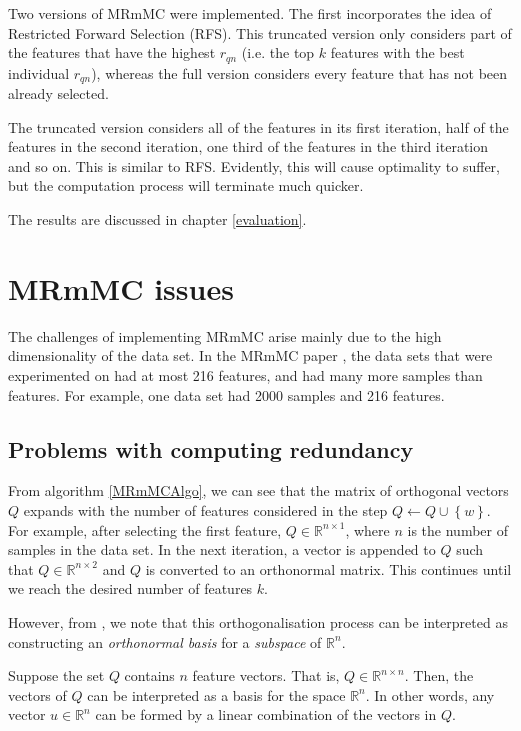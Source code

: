 \documentclass[12pt, twoside, a4paper]{report}
\begin{document}
Two versions of MRmMC were implemented. The first incorporates the idea of Restricted Forward Selection (RFS). This truncated version only considers part of the features that have the highest $r_{qn}$ (i.e. the top $k$ features with the best individual $r_{qn}$), whereas the full version considers every feature that has not been already selected.

The truncated version considers all of the features in its first iteration, half of the features in the second iteration, one third of the features in the third iteration and so on. This is similar to RFS. Evidently, this will cause optimality to suffer, but the computation process will terminate much quicker.

The results are discussed in chapter \ref{evaluation}.

\section{MRmMC issues} \label{mrmmc:issues}

The challenges of implementing MRmMC arise mainly due to the high dimensionality of the data set. In the MRmMC paper \cite{RefWorks:187}, the data sets that were experimented on had at most 216 features, and had many more samples than features. For example, one data set had 2000 samples and 216 features.

\subsection{Problems with computing redundancy} \label{mrmmc_probs}

From algorithm \ref{MRmMCAlgo}, we can see that the matrix of orthogonal vectors $Q$ expands with the number of features considered in the step $Q \longleftarrow Q \cup \left\lbrace w \right\rbrace$. For example, after selecting the first feature, $Q \in \mathbb{R}^{n \times 1}$, where $n$ is the number of samples in the data set. In the next iteration, a vector is appended to $Q$ such that $Q \in \mathbb{R}^{n \times 2}$ and $Q$ is converted to an orthonormal matrix. This continues until we reach the desired number of features $k$.

However, from \cite{RefWorks:253}, we note that this orthogonalisation process can be interpreted as constructing an \textit{orthonormal basis} for a \textit{subspace} of $\mathbb{R}^{n}$.

Suppose the set $Q$ contains $n$ feature vectors. That is, $Q \in \mathbb{R}^{n \times n}$. Then, the vectors of $Q$ can be interpreted as a basis for the space $\mathbb{R}^{n}$. In other words, any vector $u \in \mathbb{R}^{n}$ can be formed by a linear combination of the vectors in $Q$.
\end{document}
